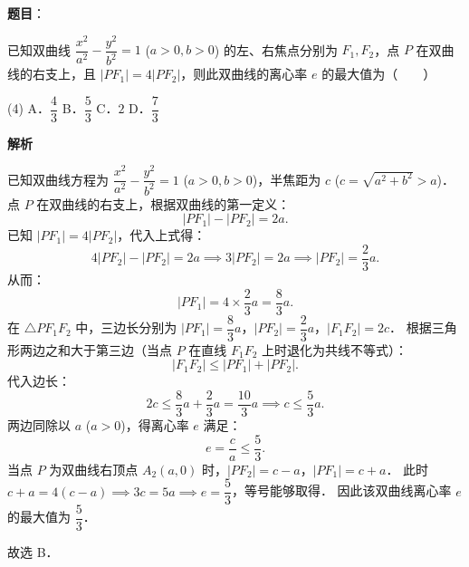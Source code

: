 \begin{answer}

\textbf{题目}：

已知双曲线 $\dfrac{x^2}{a^2} - \dfrac{y^2}{b^2} = 1$ ($a > 0, b > 0$) 的左、右焦点分别为 $F_1, F_2$，点 $P$ 在双曲线的右支上，且 $|PF_1| = 4|PF_2|$，则此双曲线的离心率 $e$ 的最大值为\mbox{（　　）}

\begin{gkopts}(4)
\task A．$\dfrac{4}{3}$
\task B．$\dfrac{5}{3}$
\task C．$2$
\task D．$\dfrac{7}{3}$
\end{gkopts}

\textbf{解析}

已知双曲线方程为 $\dfrac{x^2}{a^2} - \dfrac{y^2}{b^2} = 1$ ($a > 0, b > 0$)，半焦距为 $c$ ($c = \sqrt{a^2 + b^2} > a$)．
点 $P$ 在双曲线的右支上，根据双曲线的第一定义：
\nopagebreak[4]
\[
|PF_1| - |PF_2| = 2a.
\]
已知 $|PF_1| = 4|PF_2|$，代入上式得：
\nopagebreak[4]
\[
4|PF_2| - |PF_2| = 2a \implies 3|PF_2| = 2a \implies |PF_2| = \frac{2}{3}a.
\]
从而：
\nopagebreak[4]
\[
|PF_1| = 4 \times \frac{2}{3}a = \frac{8}{3}a.
\]
在 $\triangle PF_1 F_2$ 中，三边长分别为 $|PF_1| = \dfrac{8}{3}a$，$|PF_2| = \dfrac{2}{3}a$，$|F_1 F_2| = 2c$．
根据三角形两边之和大于第三边（当点 $P$ 在直线 $F_1 F_2$ 上时退化为共线不等式）：
\nopagebreak[4]
\[
|F_1 F_2| \leqslant |PF_1| + |PF_2|.
\]
代入边长：
\nopagebreak[4]
\[
2c \leqslant \frac{8}{3}a + \frac{2}{3}a = \frac{10}{3}a \implies c \leqslant \frac{5}{3}a.
\]
两边同除以 $a$ ($a > 0$)，得离心率 $e$ 满足：
\nopagebreak[4]
\[
e = \frac{c}{a} \leqslant \frac{5}{3}.
\]
当点 $P$ 为双曲线右顶点 $A_2(a, 0)$ 时，$|PF_2| = c - a$，$|PF_1| = c + a$．
此时 $c + a = 4(c - a) \implies 3c = 5a \implies e = \dfrac{5}{3}$，等号能够取得．
因此该双曲线离心率 $e$ 的最大值为 $\dfrac{5}{3}$．

故选 B．


\end{answer}
